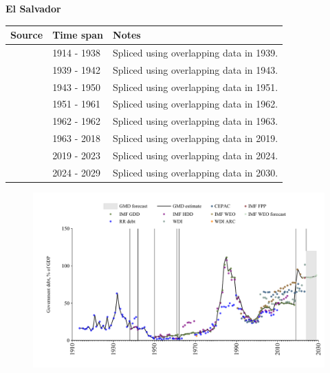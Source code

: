 \documentclass[12pt,a4paper,landscape]{article}
\begin{document}
\begin{adjustbox}{max totalsize={\paperwidth}{\paperheight},center}
\begin{minipage}[t][\textheight][t]{\textwidth}
\vspace*{0.5cm}
{}
\begin{center}
{\Large\bfseries El Salvador}
\end{center}
\vspace{0.5cm}
\begin{table}[H]
\centering
\small
\begin{tabular}{|l|l|l|}
\hline
\textbf{Source} & \textbf{Time span} & \textbf{Notes} \\
\hline
\rowcolor{white}\cite{RR_debt}& 1914 - 1938 &Spliced using overlapping data in 1939.\\
\rowcolor{lightgray}\cite{IMF_HDD}& 1939 - 1942 &Spliced using overlapping data in 1943.\\
\rowcolor{white}\cite{RR_debt}& 1943 - 1950 &Spliced using overlapping data in 1951.\\
\rowcolor{lightgray}\cite{IMF_GDD}& 1951 - 1961 &Spliced using overlapping data in 1962.\\
\rowcolor{white}\cite{RR_debt}& 1962 - 1962 &Spliced using overlapping data in 1963.\\
\rowcolor{lightgray}\cite{IMF_GDD}& 1963 - 2018 &Spliced using overlapping data in 2019.\\
\rowcolor{white}\cite{IMF_FPP}& 2019 - 2023 &Spliced using overlapping data in 2024.\\
\rowcolor{lightgray}\cite{IMF_WEO_forecast}& 2024 - 2029 &Spliced using overlapping data in 2030.\\
\hline
\end{tabular}
\end{table}
\begin{figure}[H]
\centering
\includegraphics[width=\textwidth,height=0.6\textheight,keepaspectratio]{graphs/SLV_govdebt_GDP.pdf}
\end{figure}
\end{minipage}
\end{adjustbox}
\end{document}
